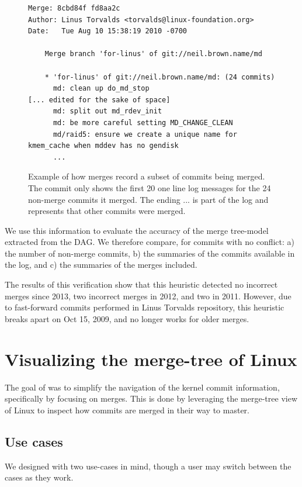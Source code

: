 \documentclass[conference, draftclsnofoot, draft]{IEEEtran}
\begin{document}
\begin{figure}[htbp]
  \centering
{\tiny
\begin{verbatim}
Merge: 8cbd84f fd8aa2c
Author: Linus Torvalds <torvalds@linux-foundation.org>
Date:   Tue Aug 10 15:38:19 2010 -0700

    Merge branch 'for-linus' of git://neil.brown.name/md
    
    * 'for-linus' of git://neil.brown.name/md: (24 commits)
      md: clean up do_md_stop
[... edited for the sake of space]
      md: split out md_rdev_init
      md: be more careful setting MD_CHANGE_CLEAN
      md/raid5: ensure we create a unique name for kmem_cache when mddev has no gendisk
      ...
\end{verbatim}}
  \caption{Example of how merges record a subset of commits being merged. The commit only shows the first 20 one line log messages for the 24 non-merge commits
    it merged. The ending ... is part of the log and represents that other commits were merged.}
  \label{fig:sampleMerge}
\end{figure}

We use this information to evaluate the accuracy of the merge tree-model extracted from the DAG. We therefore compare, for commits with no conflict: a) the number of
non-merge commits, b) the summaries of the commits available in the log, and c) the summaries of the merges included.

The results of this verification show that this heuristic detected no incorrect merges since 2013, two incorrect merges in 2012, and two in 2011. However, due
to fast-forward commits performed in Linus Torvalds repository, this heuristic breaks apart on Oct 15, 2009, and no longer works for older merges. 


\section{Visualizing the merge-tree of Linux}

The goal of \tool was to simplify the  navigation of the kernel commit information, specifically by focusing on merges.
This is done by leveraging the merge-tree view of Linux to inspect how commits are merged in their way to master.

\subsection{Use cases}

We designed \tool with two use-cases in mind, though a user may switch between the
cases as they work.
\end{document}
